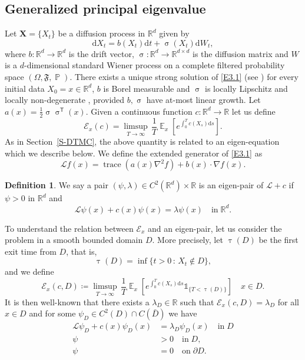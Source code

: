 \documentclass[notitlepage,11pt,reqno]{amsart}
\numberwithin{equation}{section}
\theoremstyle{plain}
\theoremstyle{definition}
\newtheorem{definition}{Definition}[section]
\theoremstyle{remark}
\newcommand{\Ind}{\mathds{1}}       %
\newcommand{\sE}{{\mathscr{E}}}     %
\newcommand{\sL}{{\mathscr{L}}}
\newcommand{\RR}{\mathds{R}} %
\newcommand{\Rd}{{\mathds{R}^{d}}}
\DeclareMathOperator{\Exp}{\mathbb{E}} %
\DeclareMathOperator{\Prob}{\mathbb{P}} %
\newcommand{\D}{\mathrm{d}} %
\newcommand{\transp}{^{\mathsf{T}}}
\DeclareMathOperator*{\trace}{trace}
\newcommand{\grad}{\nabla}
\newcommand{\df}{\coloneqq}
\begin{document}
\subsection{Generalized principal eigenvalue}
Let $\textbf{X}=\{X_t\}$ be a diffusion process in $\Rd$ given by
\begin{equation}\label{E3.1}
\D{X}_t= b(X_t) \D{t} + \upsigma(X_t)\D W_t,
\end{equation}
where $b:\Rd\to\Rd$ is the drift vector, $\upsigma:\Rd\to\RR^{d\times d}$ is the diffusion matrix and $W$ is a $d$-dimensional standard Wiener process on a 
complete filtered probability space $(\Omega, \mathfrak{F}, \Prob)$. There exists a unique strong solution of \eqref{E3.1} (see \cite{MR0336813,MR568986,MR1392450}) for every initial data $X_0=x\in\Rd$, $b$ is Borel measurable and $\upsigma$ is locally Lipschitz and locally non-degenerate ,
provided $b,  \upsigma$ have at-most linear growth.
Let $a(x)=\frac{1}{2}\upsigma\upsigma\transp(x)$.
Given a continuous function $c:\Rd\to \RR$ let us define
$$\sE_x(c)=\limsup_{T\to\infty} \, \frac{1}{T}\Exp_x\left[e^{\int_0^T c(X_s)\D{s}}\right].$$
As in Section~\ref{S-DTMC}, the above quantity is related to an eigen-equation which we describe below. We define the extended generator of \eqref{E3.1} as
\begin{equation}\label{E-lin}
\sL f(x) = \trace(a(x) \grad^2 f) + b(x)\cdot\grad f(x).
\end{equation}
\begin{definition}
We say a pair $(\psi, \lambda)\in C^2(\Rd)\times\RR$ is an eigen-pair of $\sL+c$ if $\psi>0$ in $\Rd$ and 
$$\sL\psi(x) + c(x)\psi(x) =\lambda \psi(x) \quad \text{in}\; \Rd.$$
\end{definition}
To understand the relation between $\sE_x$ and an eigen-pair, let us consider the problem in a smooth bounded domain $D$. More precisely, let $\uptau(D)$ be the first exit time from $D$, that is,
$$\uptau(D)=\inf\{t>0\, :\, X_t\notin D\},$$
and we define
$$\sE_x(c, D)\df \limsup_{T\to\infty} \, \frac{1}{T}\Exp_x\left[e^{\int_0^T c(X_s)\D{s}}\Ind_{\{T<\uptau(D)\}}\right] \quad x\in D.$$
It is then well-known that  there exists a $\lambda_D\in\RR$ such that $\sE_x(c, D)=\lambda_D$ for all $x\in D$ \cite{MR425380} and 
for some $\psi_D\in C^2(D)\cap C(\bar{D})$ we have
\begin{equation}\label{E3.2}
\begin{split}
\sL \psi_D + c(x)\psi_D(x) &=\lambda_D \psi_D(x)\quad \text{in}\; D
\\
\psi & >0 \quad \text{in}\; D,
\\
\psi &=0 \quad \text{on}\; \partial D.
\end{split}
\end{equation}
\end{document}
